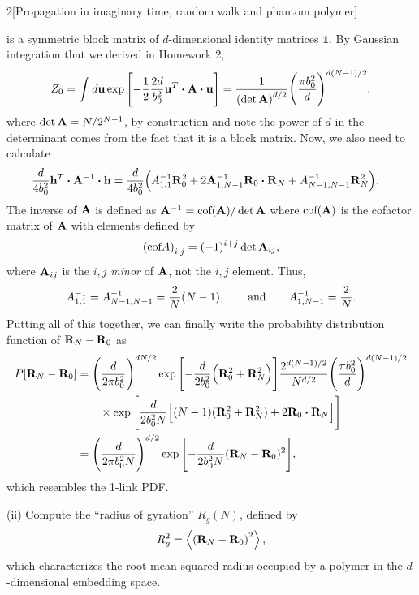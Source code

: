 \documentclass[12pt]{article}
\begin{document}
\begin{problem}{2}[Propagation in imaginary time, random walk and phantom
    polymer]
\begin{solution}
is a symmetric block matrix of $d$-dimensional identity matrices $\mathbb{1}$. 
By Gaussian integration that we derived in Homework 2,
\begin{align}
    Z_0=\int
    d\vb{u}\exp\qty[-\frac12\frac{2d}{b_0^2}\vb{u}^T\vdot\vb{A}\vdot\vb{u}]
    =\frac1{\qty(\det\vb{A})^{d/2}}\qty(\frac{\pi b_0^2}{d})^{d(N-1)/2},
\end{align}
where $\det\vb{A}=N/2^{N-1}$, by construction and note the power of $d$ in the
determinant comes from the fact that it is a block matrix. Now, we also need to 
calculate
\begin{align}
    \frac{d}{4b_0^2}\vb{h}^T\vdot\vb{A}^{-1}\vdot\vb{h} 
    &=\frac{d}{4b_0^2}\qty(A_{1,1}^{-1}\vb{R}_0^2+2\vb{A}_{1,N-1}^{-1}\vb{R}_0\vdot\vb{R}_N+A_{N-1,N-1}^{-1}\vb{R}_N^2).
\end{align}
The inverse of $\vb{A}$ is defined as $\vb{A}^{-1}=\text{cof}(\vb{A})/\det\vb{A}$
where $\text{cof}(\vb{A})$ is the cofactor matrix of $\vb{A}$ with elements defined
by
\begin{align}
    \qty(\text{cof}A)_{i,j}=(-1)^{i+j}\det\vb{A}_{ij},
\end{align}
where $\vb{A}_{ij}$ is the $i,j$ \textit{minor} of $\vb{A}$, not the $i,j$
element. Thus,
\begin{equation}
    A_{1,1}^{-1}=A_{N-1,N-1}^{-1}=\frac2N(N-1),\qquad\text{and}
    \qquad
    A_{1,N-1}^{-1}=\frac2N.
\end{equation}
Putting all of this together, we can finally write the probability distribution
function of $\vb{R}_N-\vb{R}_0$ as
\begin{align}
    P\qty[\vb{R}_N-\vb{R}_0]
    &=\qty(\frac{d}{2\pi b_0^2})^{dN/2}
        \exp\qty[-\frac{d}{2b_0^2}\qty(\vb{R}_0^2+\vb{R}_N^2)]
        \frac{2^{d(N-1)/2}}{N^{d/2}}\qty(\frac{\pi b_0^2}{d})^{d(N-1)/2}
        \notag\\
    &\qquad\times
        \exp\qty[\frac{d}{2b_0^2N}\qty[(N-1)(\vb{R}_0^2+\vb{R}_N^2)+2\vb{R}_0\vdot\vb{R}_N]]\notag\\
    &=\qty(\frac{d}{2\pi b_0^2N})^{d/2}
        \exp\qty[-\frac{d}{2b_0^2N}(\vb{R}_N-\vb{R}_0)^2],
\end{align}
which resembles the 1-link PDF.
\end{solution}

\qquad(ii) Compute the ``radius of gyration'' $R_g(N)$, defined by
\begin{equation}
    R_g^2=\expval{\qty(\vb{R}_N-\vb{R}_0)^2}, 
\end{equation}
which characterizes the root-mean-squared radius occupied by a polymer in the
$d$-dimensional embedding space.


\end{problem}
\end{document}
